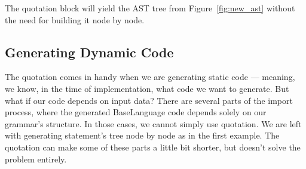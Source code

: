 The quotation block will yield the AST tree from Figure~\ref{fig:new_ast} without the need for building it node by node.

\subsection{Generating Dynamic Code}

The quotation comes in handy when we are generating static code --- meaning, we know, in the time of implementation, what code we want to generate.
But what if our code depends on input data?
There are several parts of the import process, where the generated BaseLanguage code depends solely on our grammar's structure.
In those cases, we cannot simply use quotation.
We are left with generating statement's tree node by node as in the first example.
The quotation can make some of these parts a little bit shorter, but doesn't solve the problem entirely.